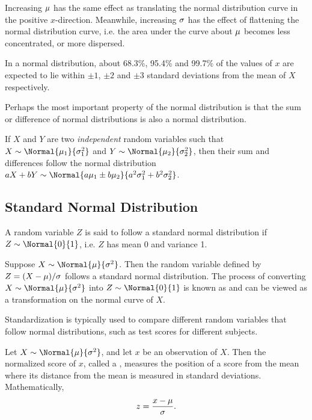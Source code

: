 \medskip

Increasing $\mu$ has the same effect as translating the normal distribution curve in the positive $x$-direction. Meanwhile, increasing $\sigma$ has the effect of flattening the normal distribution curve, i.e. the area under the curve about $\mu$ becomes less concentrated, or more dispersed.

In a normal distribution, about 68.3\%, 95.4\% and 99.7\% of the values of $x$ are expected to lie within $\pm 1$, $\pm 2$ and $\pm 3$ standard deviations from the mean of $X$ respectively.

Perhaps the most important property of the normal distribution is that the sum or difference of normal distributions is also a normal distribution.

\begin{fact}
    If $X$ and $Y$ are two \emph{independent} random variables such that $X \sim \Normal{\m_1}{\s_1^2}$ and $Y \sim \Normal{\m_2}{\s_2^2}$, then their sum and differences follow the normal distribution $aX + bY \sim \Normal{a \m_1 \pm b \m_2}{a^2 \s_1^2 + b^2 \s_2^2}$.
\end{fact}

\subsection{Standard Normal Distribution}

\begin{definition}
    A random variable $Z$ is said to follow a standard normal distribution if $Z \sim \Normal{0}{1}$, i.e. $Z$ has mean 0 and variance 1.
\end{definition}

Suppose $X \sim \Normal{\m}{\s^2}$. Then the random variable defined by $Z = (X - \mu)/\sigma$ follows a standard normal distribution. The process of converting $X \sim \Normal{\m}{\s^2}$ into $Z \sim \Normal{0}{1}$ is known as  and can be viewed as a transformation on the normal curve of $X$.

Standardization is typically used to compare different random variables that follow normal distributions, such as test scores for different subjects.

\begin{definition}
    Let $X \sim \Normal{\m}{\s^2}$, and let $x$ be an observation of $X$. Then the normalized score of $x$, called a , measures the position of a score from the mean where its distance from the mean is measured in standard deviations. Mathematically, \[z = \frac{x - \mu}{\sigma}.\]
\end{definition}

